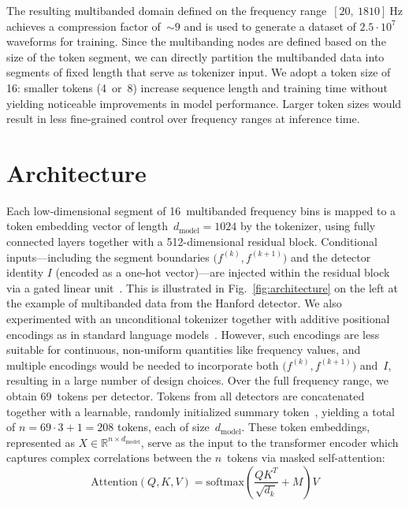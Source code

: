 The resulting multibanded domain defined on the frequency range~$[20,~ 1810]~\si{\hertz}$ achieves a compression factor of~$\sim 9$ %
and is used to generate a dataset of $2.5 \cdot 10^7$ waveforms for training.
Since the multibanding nodes are defined based on the size of the token segment, we can directly partition the multibanded data into segments of fixed length that serve as tokenizer input.
We adopt a token size of 16: smaller tokens (4~or~8) increase sequence length and training time without yielding noticeable improvements in model performance. 
Larger token sizes would result in less fine-grained control over frequency ranges at inference time.

\section{Architecture}
Each low-dimensional segment of 16~multibanded frequency bins is mapped to a token embedding vector of length~$d_\mathrm{model} = 1024$ by the tokenizer, using fully connected layers together with a 512-dimensional residual block. 
Conditional inputs---including the segment boundaries $\big(f^{(k)}, f^{(k+1)}\big)$ and the detector identity $I$ (encoded as a one-hot vector)---are injected within the residual block via a gated linear unit~\citep{dauphin_glu:2017}. 
This is illustrated in Fig.~\ref{fig:architecture} on the left at the example of multibanded data from the Hanford detector.
We also experimented with an unconditional tokenizer together with additive positional encodings as in standard language models~\citep{vaswani:2017}. 
However, such encodings are less suitable for continuous, non-uniform quantities like frequency values, and multiple encodings would be needed to incorporate both $\big(f^{(k)}, f^{(k+1)}\big)$ and~$I$, resulting in a large number of design choices.
Over the full frequency range, we obtain 69~tokens per detector. 
Tokens from all detectors are concatenated together with a learnable, randomly initialized summary token~\citep{devlin:2019, darcet_registers:2024}, yielding a total of $n = 69 \cdot 3 + 1 = 208$ tokens, each of size~$d_\mathrm{model}$.
These token embeddings, represented as \mbox{$X \in \mathbb{R}^{n \times d_\mathrm{model}}$}, serve as the input to the transformer encoder which captures complex correlations between the $n$~tokens via masked self-attention:
\begin{equation}
    \mathrm{Attention}(Q, K, V) = \mathrm{softmax} \left( \frac{QK^T}{\sqrt{d_k}} + M\right) V
\end{equation}
